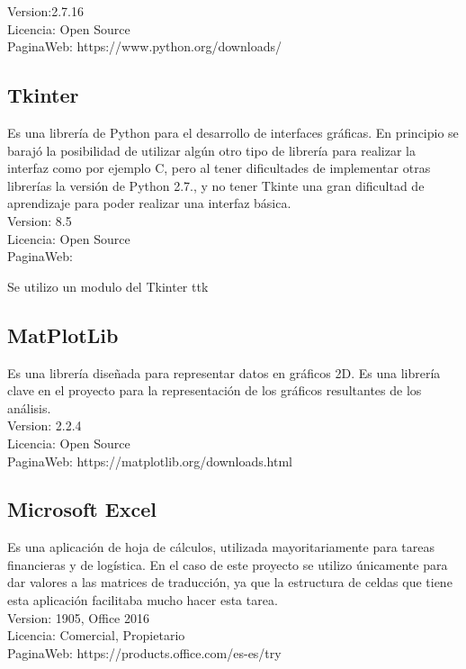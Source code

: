 Version:2.7.16\\
Licencia: Open Source\\
PaginaWeb: https://www.python.org/downloads/\\

\subsection{Tkinter}

Es una librería de Python para el desarrollo de interfaces gráficas. En principio se barajó la posibilidad de utilizar algún otro tipo de librería para realizar la interfaz como por ejemplo C, pero al tener dificultades de implementar otras librerías la versión de Python 2.7., y no tener Tkinte una gran dificultad de aprendizaje para poder realizar una interfaz básica.\\

Version: 8.5 \\
Licencia: Open Source \\
PaginaWeb: 

Se utilizo un modulo del Tkinter ttk

\subsection{MatPlotLib}

Es una librería diseñada para representar datos en gráficos 2D. Es una librería clave en el proyecto para la representación de los gráficos resultantes de los análisis.\\

Version: 2.2.4\\
Licencia: Open Source\\
PaginaWeb: https://matplotlib.org/downloads.html\\


\subsection{Microsoft Excel}
Es una aplicación de hoja de cálculos, utilizada mayoritariamente para tareas financieras y de logística. En el caso de este proyecto se utilizo únicamente para dar valores a las matrices de traducción, ya que la estructura de celdas que tiene esta aplicación facilitaba mucho hacer esta tarea.\\

Version: 1905, Office 2016 \\
Licencia: Comercial, Propietario \\
PaginaWeb: https://products.office.com/es-es/try \\

